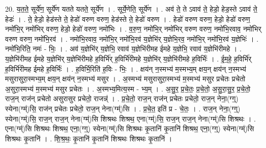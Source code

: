 \documentclass[17pt]{extarticle}
\begin{document}
20. य॒त॒ते॒ सूर्ये॑ण॒ सूर्ये॑ण यतते यतते॒ सूर्ये॑ण । . सूर्ये॒णेति॒ सूर्ये॑ण । . अव॑ ते॒ ते ऽवाव॑ ते॒ हेडो॒ हेड॒स्ते ऽवाव॑ ते॒ हेडः॑ । . ते॒ हेडो॒ हेड॑स्ते ते॒ हेडो॑ वरुण वरुण॒ हेड॑स्ते ते॒ हेडो॑ वरुण । . हेडो॑ वरुण वरुण॒ हेडो॒ हेडो॑ वरुण॒ नमो॑भि॒र् नमो॑भिर् वरुण॒ हेडो॒ हेडो॑ वरुण॒ नमो॑भिः । . व॒रु॒ण॒ नमो॑भि॒र् नमो॑भिर् वरुण वरुण॒ नमो॑भि॒रवाव॒ नमो॑भिर् वरुण वरुण॒ नमो॑भि॒रव॑ । . नमो॑भि॒रवाव॒ नमो॑भि॒र् नमो॑भि॒रव॑ य॒ज्ञेभि॑र् य॒ज्ञेभि॒रव॒ नमो॑भि॒र् नमो॑भि॒रव॑ य॒ज्ञेभिः॑ । . नमो॑भि॒रिति॒ नमः॑ - भिः॒ । . अव॑ य॒ज्ञेभि॑र् य॒ज्ञेभि॒ रवाव॑ य॒ज्ञेभि॑रीमह ईमहे य॒ज्ञेभि॒ रवाव॑ य॒ज्ञेभि॑रीमहे । . य॒ज्ञेभि॑रीमह ईमहे य॒ज्ञेभि॑र् य॒ज्ञेभि॑रीमहे ह॒विर्भि॑र् ह॒विर्भि॑रीमहे य॒ज्ञेभि॑र् य॒ज्ञेभि॑रीमहे ह॒विर्भिः॑ । . ई॒म॒हे॒ ह॒विर्भि॑र् ह॒विर्भि॑रीमह ईमहे ह॒विर्भिः॑ । . ह॒विर्भि॒रिति॑ ह॒विः - भिः॒ । . क्षय॑न् न॒स्मभ्य॑ म॒स्मभ्य॒म् क्षय॒न् क्षय॑न् न॒स्मभ्य॑ मसुरासुरा॒स्मभ्य॒म् क्षय॒न् क्षय॑न् न॒स्मभ्य॑ मसुर । . अ॒स्मभ्य॑ मसुरासुरा॒स्मभ्य॑ म॒स्मभ्य॑ मसुर प्रचेतः प्रचेतो अ॒सुरा॒स्मभ्य॑ म॒स्मभ्य॑ मसुर प्रचेतः । . अ॒स्मभ्य॒मित्य॒स्म - भ्य॒म् । . अ॒सु॒र॒ प्र॒चे॒तः॒ प्र॒चे॒तो॒ अ॒सु॒रा॒सु॒र॒ प्र॒चे॒तो॒ राज॒न् राज॑न् प्रचेतो असुरासुर प्रचेतो॒ राजन्न्॑ । . प्र॒चे॒तो॒ राज॒न् राज॑न् प्रचेतः प्रचेतो॒ राज॒न् नेना॒(ग्ग्॒) स्येना(ग्म्॑)सि॒ राज॑न् प्रचेतः प्रचेतो॒ राज॒न् नेना(ग्म्॑)सि । . प्र॒चे॒त॒ इति॑ प्र - चे॒तः॒ । . राज॒न् नेना॒(ग्ग्॒) स्येना(ग्म्॑)सि॒ राज॒न् राज॒न् नेना(ग्म्॑)सि शिश्रथः शिश्रथ॒ एना(ग्म्॑)सि॒ राज॒न् राज॒न् नेना(ग्म्॑)सि शिश्रथः । . एना(ग्म्॑)सि शिश्रथः शिश्रथ॒ एना॒(ग्ग्॒) स्येना(ग्म्॑)सि शिश्रथः कृ॒तानि॑ कृ॒तानि॑ शिश्रथ॒ एना॒(ग्ग्॒) स्येना(ग्म्॑)सि शिश्रथः कृ॒तानि॑ । . शि॒श्र॒थः॒ कृ॒तानि॑ कृ॒तानि॑ शिश्रथः शिश्रथः कृ॒तानि॑ । \newline
\end{document}
